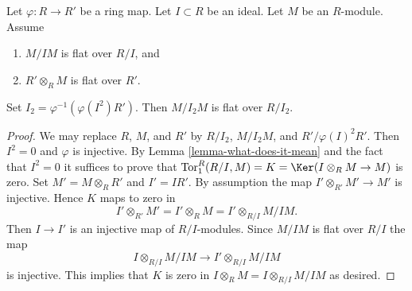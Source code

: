 \begin{lemma}
\label{lemma-prepare-lift-flatness}
Let $\varphi : R \to R'$ be a ring map.
Let $I \subset R$ be an ideal.
Let $M$ be an $R$-module.
Assume
\begin{enumerate}
\item $M/IM$ is flat over $R/I$, and
\item $R' \otimes_R M$ is flat over $R'$.
\end{enumerate}
Set $I_2 = \varphi^{-1}(\varphi(I^2)R')$.
Then $M/I_2M$ is flat over $R/I_2$.
\end{lemma}

\begin{proof}
We may replace $R$, $M$, and $R'$ by $R/I_2$, $M/I_2M$, and
$R'/\varphi(I)^2R'$. Then $I^2 = 0$ and $\varphi$ is injective. By
Lemma \ref{lemma-what-does-it-mean}
and the fact that $I^2 = 0$ it suffices to prove that
$\text{Tor}^R_1(R/I, M) = K = \Ker(I \otimes_R M \to M)$ is zero.
Set $M' = M \otimes_R R'$ and $I' = IR'$.
By assumption the map $I' \otimes_{R'} M' \to M'$ is injective.
Hence $K$ maps to zero in
$$
I' \otimes_{R'} M' = I' \otimes_R M = I' \otimes_{R/I} M/IM.
$$
Then $I \to I'$ is an injective map of $R/I$-modules.
Since $M/IM$ is flat over $R/I$ the map
$$
I \otimes_{R/I} M/IM \longrightarrow I' \otimes_{R/I} M/IM
$$
is injective. This implies that $K$ is zero in
$I \otimes_R M = I \otimes_{R/I} M/IM$ as desired.
\end{proof}
